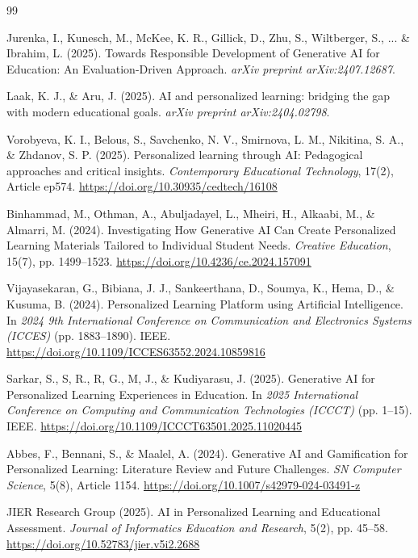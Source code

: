 
\begin{thebibliography}{99}

Jurenka, I., Kunesch, M., McKee, K. R., Gillick, D., Zhu, S., Wiltberger, S., ... \& Ibrahim, L. (2025). Towards Responsible Development of Generative AI for Education: An Evaluation-Driven Approach. \textit{arXiv preprint arXiv:2407.12687}.

Laak, K. J., \& Aru, J. (2025). AI and personalized learning: bridging the gap with modern educational goals. \textit{arXiv preprint arXiv:2404.02798}.

Vorobyeva, K. I., Belous, S., Savchenko, N. V., Smirnova, L. M., Nikitina, S. A., \& Zhdanov, S. P. (2025). Personalized learning through AI: Pedagogical approaches and critical insights. \textit{Contemporary Educational Technology}, 17(2), Article ep574. \url{https://doi.org/10.30935/cedtech/16108}

Binhammad, M., Othman, A., Abuljadayel, L., Mheiri, H., Alkaabi, M., \& Almarri, M. (2024). Investigating How Generative AI Can Create Personalized Learning Materials Tailored to Individual Student Needs. \textit{Creative Education}, 15(7), pp. 1499--1523. \url{https://doi.org/10.4236/ce.2024.157091}

Vijayasekaran, G., Bibiana, J. J., Sankeerthana, D., Soumya, K., Hema, D., \& Kusuma, B. (2024). Personalized Learning Platform using Artificial Intelligence. In \textit{2024 9th International Conference on Communication and Electronics Systems (ICCES)} (pp. 1883--1890). IEEE. \url{https://doi.org/10.1109/ICCES63552.2024.10859816}

Sarkar, S., S, R., R, G., M, J., \& Kudiyarasu, J. (2025). Generative AI for Personalized Learning Experiences in Education. In \textit{2025 International Conference on Computing and Communication Technologies (ICCCT)} (pp. 1--15). IEEE. \url{https://doi.org/10.1109/ICCCT63501.2025.11020445}

Abbes, F., Bennani, S., \& Maalel, A. (2024). Generative AI and Gamification for Personalized Learning: Literature Review and Future Challenges. \textit{SN Computer Science}, 5(8), Article 1154. \url{https://doi.org/10.1007/s42979-024-03491-z}

JIER Research Group (2025). AI in Personalized Learning and Educational Assessment. \textit{Journal of Informatics Education and Research}, 5(2), pp. 45--58. \url{https://doi.org/10.52783/jier.v5i2.2688}


\end{thebibliography}
